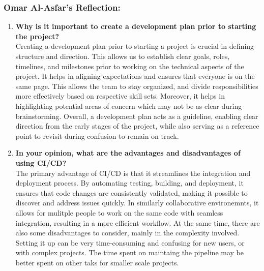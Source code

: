 \documentclass{article}
\begin{document}
\subsubsection*{Omar Al-Asfar's Reflection: }
\begin{enumerate}
    \item \textbf{Why is it important to create a development plan prior to starting the project?} \\ 
    Creating a development plan prior to starting a project is crucial in defining structure and direction. This allows us to establish clear goals, roles, timelines, and milestones prior to working on the technical aspects of the project. It helps in aligning expectations and ensures that everyone is on the same page. This allows the team to stay organized, and divide responsibilities more effectively based on respective skill sets. Moreover, it helps in highlighting potential areas of concern which may not be as clear during brainstorming. Overall, a development plan acts as a guideline, enabling clear direction from the early stages of the project, while also serving as a reference point to revisit during confusion to remain on track.
    \item \textbf{In your opinion, what are the advantages and disadvantages of using CI/CD?} \\
    The primary advantage of CI/CD is that it streamlines the integration and deployment process. By automating testing, building, and deployment, it ensures that code changes are consistently validated, making it possible to discover and address issues quickly. In similarly collaborative environemnts, it allows for mulitple people to work on the same code with seamless integration, resulting in a more efficient workflow. At the same time, there are also some disadvantages to consider, mainly in the complexity involved. Setting it up can be very time-consuming and confusing for new users, or with complex projects. The time spent on maintaing the pipeline may be better spent on other taks for smaller scale projects.
\end{enumerate}
\end{document}
